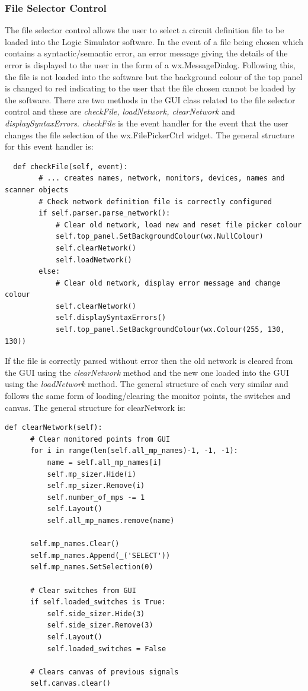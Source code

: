 \documentclass{article}					%
\begin{document}
\subsubsection{File Selector Control}
The file selector control allows the user to select a circuit definition file to be loaded into the Logic Simulator software. In the event of a file being chosen which contains a syntactic/semantic error, an error message giving the details of the error is displayed to the user in the form of a wx.MessageDialog. Following this, the file is not loaded into the software but the background colour of the top panel is changed to red indicating to the user that the file chosen cannot be loaded by the software. There are two methods in the GUI class related to the file selector control and these are \textit{checkFile, loadNetwork, clearNetwork} and \textit{displaySyntaxErrors}. \textit{checkFile} is the event handler for the event that the user changes the file selection of the wx.FilePickerCtrl widget. The general structure for this event handler is:
\begin{verbatim}
  def checkFile(self, event):
        # ... creates names, network, monitors, devices, names and scanner objects
        # Check network definition file is correctly configured
        if self.parser.parse_network():
            # Clear old network, load new and reset file picker colour
            self.top_panel.SetBackgroundColour(wx.NullColour)
            self.clearNetwork()
            self.loadNetwork()
        else:
            # Clear old network, display error message and change colour
            self.clearNetwork()
            self.displaySyntaxErrors()
            self.top_panel.SetBackgroundColour(wx.Colour(255, 130, 130))
\end{verbatim}
If the file is correctly parsed without error then the old network is cleared from the GUI using the \textit{clearNetwork} method and the new one loaded into the GUI using the \textit{loadNetwork} method. The general structure of each very similar and follows the same form of loading/clearing the monitor points, the switches and canvas. The general structure for clearNetwork is:
\begin{verbatim}
def clearNetwork(self):
      # Clear monitored points from GUI
      for i in range(len(self.all_mp_names)-1, -1, -1):
          name = self.all_mp_names[i]
          self.mp_sizer.Hide(i)
          self.mp_sizer.Remove(i)
          self.number_of_mps -= 1
          self.Layout()
          self.all_mp_names.remove(name)

      self.mp_names.Clear()
      self.mp_names.Append(_('SELECT'))
      self.mp_names.SetSelection(0)

      # Clear switches from GUI
      if self.loaded_switches is True:
          self.side_sizer.Hide(3)
          self.side_sizer.Remove(3)
          self.Layout()
          self.loaded_switches = False

      # Clears canvas of previous signals
      self.canvas.clear()
\end{verbatim}
\end{document}
